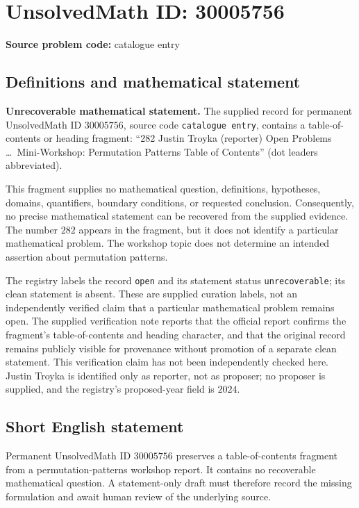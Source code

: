 \documentclass[11pt]{article}
\begin{document}
\section*{UnsolvedMath ID: 30005756}
\textbf{Source problem code:} catalogue entry
\subsection{Definitions and mathematical statement}
\textbf{Unrecoverable mathematical statement.} The supplied record for permanent UnsolvedMath ID \(30005756\), source code \texttt{catalogue entry}, contains a table-of-contents or heading fragment: ``282 Justin Troyka (reporter) Open Problems \ldots\ Mini-Workshop: Permutation Patterns Table of Contents'' (dot leaders abbreviated).

This fragment supplies no mathematical question, definitions, hypotheses, domains, quantifiers, boundary conditions, or requested conclusion. Consequently, no precise mathematical statement can be recovered from the supplied evidence. The number \(282\) appears in the fragment, but it does not identify a particular mathematical problem. The workshop topic does not determine an intended assertion about permutation patterns.

The registry labels the record \texttt{open} and its statement status \texttt{unrecoverable}; its clean statement is absent. These are supplied curation labels, not an independently verified claim that a particular mathematical problem remains open. The supplied verification note reports that the official report confirms the fragment's table-of-contents and heading character, and that the original record remains publicly visible for provenance without promotion of a separate clean statement. This verification claim has not been independently checked here. Justin Troyka is identified only as reporter, not as proposer; no proposer is supplied, and the registry's proposed-year field is \(2024\).
\subsection{Short English statement}
Permanent UnsolvedMath ID \(30005756\) preserves a table-of-contents fragment from a permutation-patterns workshop report. It contains no recoverable mathematical question. A statement-only draft must therefore record the missing formulation and await human review of the underlying source.
\end{document}
